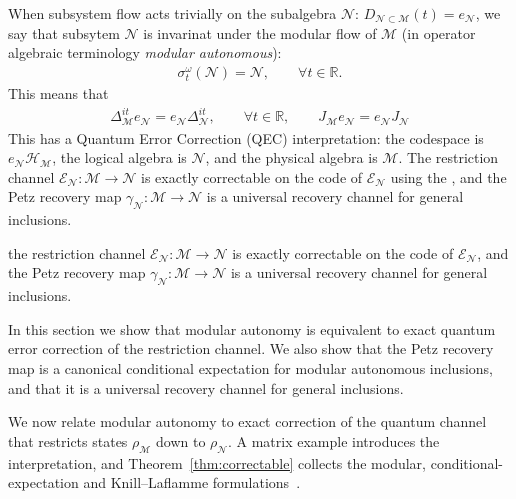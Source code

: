 \documentclass[a4paper,11pt]{article}
\theoremstyle{definition}
\newcommand{\mN}{\mathcal{N}}
\newcommand{\mH}{\mathcal{H}}
\newcommand{\mM}{\mathcal{M}}
\newcommand{\mE}{\mathcal{E}}
\begin{document}
When subsystem flow acts trivially on the subalgebra $\mN$: $D_{\mN\subset\mM}(t)=e_\mN$, we say that subsytem $\mN$ is invarinat under the modular flow of $\mM$ (in operator algebraic terminology \emph{modular autonomous}):
\begin{align}
    \sigma_t^\omega(\mN)=\mN,\qquad \forall t\in\mathbb R.
\end{align}
This means that 
\begin{align}
\Delta_\mM^{it}e_\mN=e_\mN \Delta_\mN^{it},\qquad \forall t\in\mathbb R, \qquad J_\mM e_\mN=e_\mN J_\mN
\end{align}
This has a Quantum Error Correction (QEC) interpretation: the codespace is $e_\mN\mH_\mM$, the logical algebra is $\mN$, and the physical algebra is $\mM$. The restriction channel $\mE_\mN:\mM\to\mN$ is exactly correctable on the code of $\mE_\mN$ using the , and the Petz recovery map $\gamma_\mN:\mM\to\mN$ is a universal recovery channel for general inclusions.

the restriction channel $\mE_\mN:\mM\to\mN$ is exactly correctable on the code of $\mE_\mN$, and the Petz recovery map $\gamma_\mN:\mM\to\mN$ is a universal recovery channel for general inclusions.

In this section we show that modular autonomy is equivalent to exact quantum error correction of the restriction channel. We also show that the Petz recovery map is a canonical conditional expectation for modular autonomous inclusions, and that it is a universal recovery channel for general inclusions.

We now relate modular autonomy to exact correction of the quantum channel that restricts states $\rho_\mM$ down to $\rho_\mN$. A matrix example introduces the interpretation, and Theorem~\ref{thm:correctable} collects the modular, conditional-expectation and Knill--Laflamme formulations~\cite{Faulkner2020,FaulknerSperanza2024}.
\end{document}
